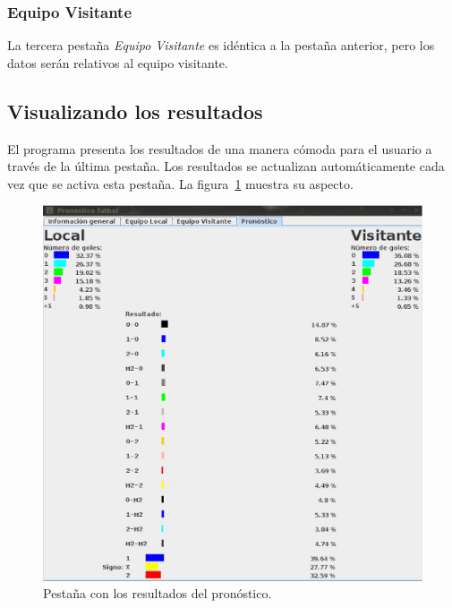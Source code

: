 \documentclass[a4paper,12pt]{article}
\begin{document}
\subsubsection{Equipo Visitante}
La tercera pestaña \textit{Equipo Visitante} es idéntica a la pestaña anterior, pero los datos serán relativos al equipo visitante.

\subsection{Visualizando los resultados}
El programa presenta los resultados de una manera cómoda para el usuario a través de la última pestaña.
Los resultados se actualizan automáticamente cada vez que se activa esta pestaña. 
La figura~\ref{fig:p4} muestra su aspecto.
\begin{figure}[h]
 \begin{center}
  \includegraphics[scale=0.4]{p4.eps}
\caption{Pestaña con los resultados del pronóstico.}
\label{fig:p4}
 \end{center}
\end{figure} 
\end{document}
